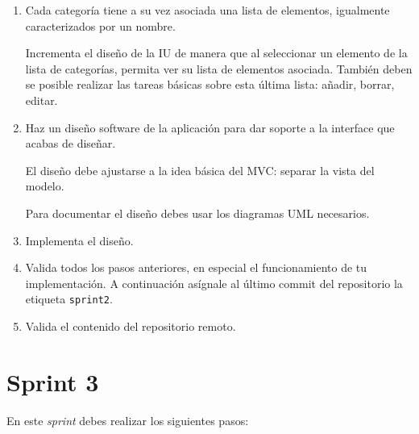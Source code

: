 \documentclass[11pt,a4paper]{article}
\begin{document}
\begin{enumerate}
\item Cada categoría tiene a su vez asociada una lista de elementos,
  igualmente caracterizados por un nombre.

  Incrementa el diseño de la IU de manera que al seleccionar un
  elemento de la lista de categorías, permita ver su lista de
  elementos asociada. También deben se posible realizar las tareas
  básicas sobre esta última lista: añadir, borrar, editar.

\item Haz un diseño software de la aplicación para dar soporte a la
  interface que acabas de diseñar.

  El diseño debe ajustarse a la idea básica del MVC: separar la vista
  del modelo.

  Para documentar el diseño debes usar los diagramas UML necesarios.

\item Implementa el diseño.

\item Valida todos los pasos anteriores, en especial el funcionamiento
  de tu implementación. A continuación asígnale al último commit del
  repositorio la etiqueta \texttt{sprint2}.

\item Valida el contenido del repositorio remoto.
\end{enumerate}


\section{Sprint 3}

En este \emph{sprint} debes realizar los siguientes pasos:
\end{document}

